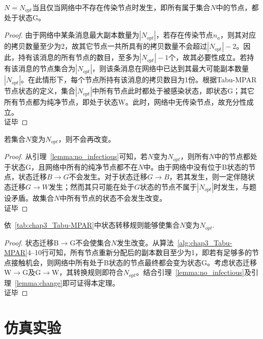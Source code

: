 \begin{lemma}
$N=N_{opt}$当且仅当网络中不存在传染节点时发生，即所有属于集合$N$中的节点，都处于状态G。
\label{lemma:no_infectious}
\end{lemma}
\begin{proof}
由于网络中某条消息最大副本数量为$|N_{opt}|$，若存在传染节点$n_a$，则其对应的拷贝数量至少为2，故其它节点一共所具有的拷贝数量不会超过$|N_{opt}|-2$。因此，持有该消息的所有节点的数目，至多为$|N_{opt}|-1$个，故其必要性成立。若持有该消息的节点集合为$|N_{opt}|$，则该条消息在网络中已达到其最大可能副本数量$|N_{opt}|$。在此情形下，每个节点所持有该消息的拷贝数目为1份。根据Tabu-MPAR节点状态的定义，集合$|N_{opt}|$中所有节点此时都处于被感染状态，即状态G；其它所有节点都为纯净节点，即处于状态W。此时，网络中无传染节点，故充分性成立。\\
证毕
\end{proof}



\begin{lemma}
若集合$N$变为$N_{opt}$，则不会再改变。
\label{lemma:change}
\end{lemma}
\begin{proof}
从引理~\ref{lemma:no_infectious}可知，若$N$变为$N_{opt}$，则所有$N$中的节点都处于状态G，且网络中所有的纯净节点都不在$N$中。由于网络中没有位于B状态的节点，状态迁移$B\rightarrow G$不会发生。对于状态迁移$G\rightarrow B$，若其发生，则一定伴随状态迁移$G\rightarrow W$发生；然而其只可能在处于$G$状态的节点不属于$|N_{opt}|$时发生，与题设矛盾。故集合$N$中所有节点的状态不会发生改变。\\
证毕
\end{proof}

\begin{theorem}
依\tablename~\ref{tab:chap3_Tabu-MPAR}中状态转移规则能够使集合$N$变为$N_{opt}$.
\end{theorem}
\begin{proof}
状态迁移B$\rightarrow$G不会使集合$N$发生改变。从算法~\ref{alg:chap3_Tabu-MPAR}4--10行可知，所有节点重新分配后的副本数目至少为1，即若有足够多的节点接触机会，则网络中所有处于B状态的节点最终都会变为状态G。考虑状态迁移W$\rightarrow$G及G$\rightarrow$W，其转换规则即符合$N_{opt}$。结合引理~\ref{lemma:no_infectious}及引理~\ref{lemma:change}即可证得本定理。\\
证毕
\end{proof}


\section{仿真实验}
\label{chap3:仿真实验}


